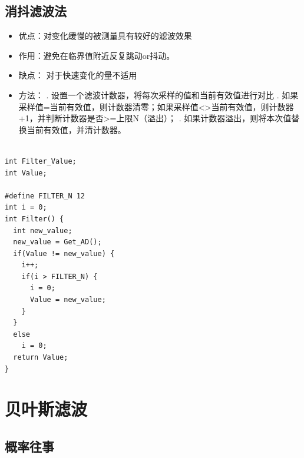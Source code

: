 \documentclass[12pt]{ctexart}
\begin{document}
\subsection{消抖滤波法}
\begin{itemize}
    \item 优点：对变化缓慢的被测量具有较好的滤波效果
    \item 作用：避免在临界值附近反复跳动or抖动。
    \item 缺点： 对于快速变化的量不适用
    \item 方法：
    . 设置一个滤波计数器，将每次采样的值和当前有效值进行对比
    . 如果采样值=当前有效值，则计数器清零；如果采样值<>当前有效值，则计数器+1，并判断计数器是否>=上限N（溢出）；
    . 如果计数器溢出，则将本次值替换当前有效值，并清计数器。
\end{itemize}
\begin{lstlisting}
    
int Filter_Value;
int Value;

#define FILTER_N 12
int i = 0;
int Filter() {
  int new_value;
  new_value = Get_AD();
  if(Value != new_value) {
    i++;
    if(i > FILTER_N) {
      i = 0;
      Value = new_value;
    }
  }
  else
    i = 0;
  return Value;
}

\end{lstlisting}
\section{贝叶斯滤波}
\subsection{概率往事}
\end{document}
